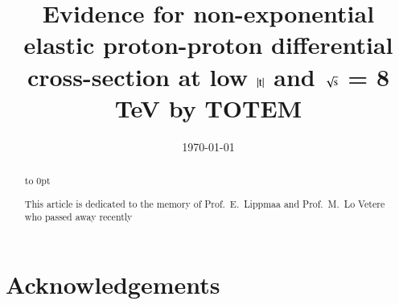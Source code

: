 \documentclass[3p,onecolumn,12pt,times,longtitle]{elsarticle}
\begin{document}
\begin{frontmatter}

\title{Evidence for non-exponential elastic proton-proton differential cross-section at low $|\hbox{t}|$ and $\sqrt{\hbox{s}}$ = 8 TeV by TOTEM}


\date{\today}

\begin{abstract}

\vbox to 0pt{%
	\vskip-73mm
	\centerline{\footnotesize This article is dedicated to the memory of Prof.~E.~Lippmaa and Prof.~M.~Lo Vetere who passed away recently}%
	\vss
}
\end{abstract}


\end{frontmatter}















\section*{Acknowledgements}



\begin{thebibliography}{99}

\end{thebibliography}
\end{document}
